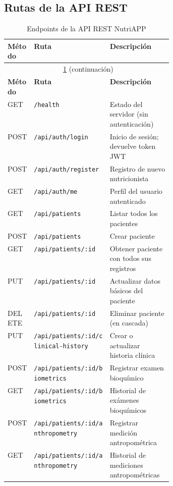 \documentclass[12pt,a4paper]{article}
\begin{document}
\subsection{Rutas de la API REST}

\begin{longtable}{|l|l|p{0.38\linewidth}|}
\caption{Endpoints de la API REST NutriAPP}
\label{tab:endpoints} \\
\hline
\textbf{Método} & \textbf{Ruta} & \textbf{Descripción} \\
\hline
\endfirsthead
\multicolumn{3}{c}{\tablename~\ref{tab:endpoints} (continuación)} \\
\hline
\textbf{Método} & \textbf{Ruta} & \textbf{Descripción} \\
\hline
\endhead
\hline
\endfoot
GET    & \texttt{/health}                            & Estado del servidor (sin autenticación) \\
\hline
POST   & \texttt{/api/auth/login}                    & Inicio de sesión; devuelve token JWT \\
\hline
POST   & \texttt{/api/auth/register}                 & Registro de nuevo nutricionista \\
\hline
GET    & \texttt{/api/auth/me}                       & Perfil del usuario autenticado \\
\hline
GET    & \texttt{/api/patients}                      & Listar todos los pacientes \\
\hline
POST   & \texttt{/api/patients}                      & Crear paciente \\
\hline
GET    & \texttt{/api/patients/:id}                  & Obtener paciente con todos sus registros \\
\hline
PUT    & \texttt{/api/patients/:id}                  & Actualizar datos básicos del paciente \\
\hline
DELETE & \texttt{/api/patients/:id}                  & Eliminar paciente (en cascada) \\
\hline
PUT    & \texttt{/api/patients/:id/clinical-history} & Crear o actualizar historia clínica \\
\hline
POST   & \texttt{/api/patients/:id/biometrics}       & Registrar examen bioquímico \\
\hline
GET    & \texttt{/api/patients/:id/biometrics}       & Historial de exámenes bioquímicos \\
\hline
POST   & \texttt{/api/patients/:id/anthropometry}    & Registrar medición antropométrica \\
\hline
GET    & \texttt{/api/patients/:id/anthropometry}    & Historial de mediciones antropométricas \\

\end{longtable}
\end{document}
